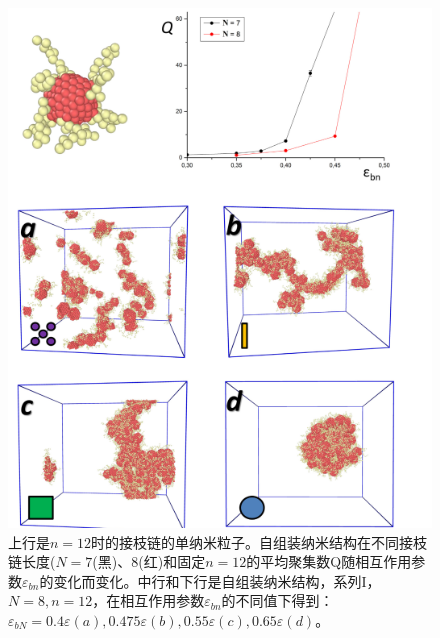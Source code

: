 \documentclass[12pt,a4paper]{article}
\numberwithin{equation}{section}
\begin{document}
\begin{figure}[H]
\centering
\includegraphics[scale=0.4]{./figures/24.png}
\caption{上行是$n=12$时的接枝链的单纳米粒子。自组装纳米结构在不同接枝链长度($N=7$(黑)、$8$(红)和固定$n=12$的平均聚集数Q随相互作用参数$\varepsilon_{bn}$的变化而变化。中行和下行是自组装纳米结构，系列I，$N= 8,n=12$，在相互作用参数$\varepsilon_{bn}$的不同值下得到：$\varepsilon_{bN}=0.4\varepsilon(a),0.475\varepsilon(b),0.55\varepsilon(c),0.65\varepsilon(d)$。}
\end{figure}

















	
\end{document}
